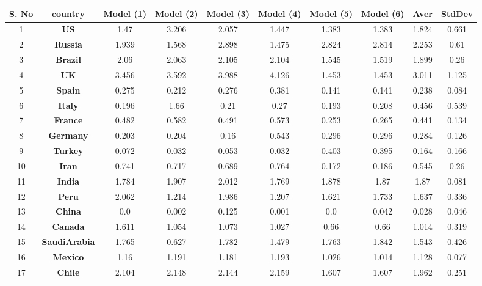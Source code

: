 \begin{table*}
\begin{center}
\begin{tiny}
\begin{tabular}{|c|c|c|c|c|c|c|c|c|c|} \hline
\bf{S. No} & \bf{country} & \bf{Model (1)} & \bf{Model (2)} & \bf{Model (3)} & \bf{Model (4)} & \bf{Model (5)} & \bf{Model (6)} & \bf{Aver} & \bf{StdDev}\\ \hline
1 & {\bf US} & 1.47 & 3.206 & 2.057 & 1.447 & 1.383 & 1.383 & 1.824 & 0.661\\ \hline
2 & {\bf Russia} & 1.939 & 1.568 & 2.898 & 1.475 & 2.824 & 2.814 & 2.253 & 0.61\\ \hline
3 & {\bf Brazil} & 2.06 & 2.063 & 2.105 & 2.104 & 1.545 & 1.519 & 1.899 & 0.26\\ \hline
4 & {\bf UK} & 3.456 & 3.592 & 3.988 & 4.126 & 1.453 & 1.453 & 3.011 & 1.125\\ \hline
5 & {\bf Spain} & 0.275 & 0.212 & 0.276 & 0.381 & 0.141 & 0.141 & 0.238 & 0.084\\ \hline
6 & {\bf Italy} & 0.196 & 1.66 & 0.21 & 0.27 & 0.193 & 0.208 & 0.456 & 0.539\\ \hline
7 & {\bf France} & 0.482 & 0.582 & 0.491 & 0.573 & 0.253 & 0.265 & 0.441 & 0.134\\ \hline
8 & {\bf Germany} & 0.203 & 0.204 & 0.16 & 0.543 & 0.296 & 0.296 & 0.284 & 0.126\\ \hline
9 & {\bf Turkey} & 0.072 & 0.032 & 0.053 & 0.032 & 0.403 & 0.395 & 0.164 & 0.166\\ \hline
10 & {\bf Iran} & 0.741 & 0.717 & 0.689 & 0.764 & 0.172 & 0.186 & 0.545 & 0.26\\ \hline
11 & {\bf India} & 1.784 & 1.907 & 2.012 & 1.769 & 1.878 & 1.87 & 1.87 & 0.081\\ \hline
12 & {\bf Peru} & 2.062 & 1.214 & 1.986 & 1.207 & 1.621 & 1.733 & 1.637 & 0.336\\ \hline
13 & {\bf China} & 0.0 & 0.002 & 0.125 & 0.001 & 0.0 & 0.042 & 0.028 & 0.046\\ \hline
14 & {\bf Canada} & 1.611 & 1.054 & 1.073 & 1.027 & 0.66 & 0.66 & 1.014 & 0.319\\ \hline
15 & {\bf SaudiArabia} & 1.765 & 0.627 & 1.782 & 1.479 & 1.763 & 1.842 & 1.543 & 0.426\\ \hline
16 & {\bf Mexico} & 1.16 & 1.191 & 1.181 & 1.193 & 1.026 & 1.014 & 1.128 & 0.077\\ \hline
17 & {\bf Chile} & 2.104 & 2.148 & 2.144 & 2.159 & 1.607 & 1.607 & 1.962 & 0.251\\ \hline

\end{tabular}
\end{tiny}
\end{center}
\end{table*}
